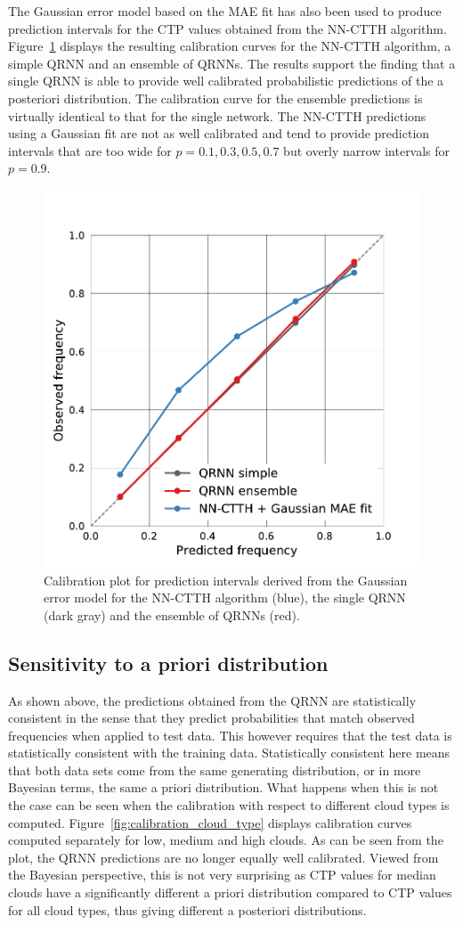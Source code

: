 \documentclass[journal abbreviation, manuscript]{copernicus}
\begin{document}
The Gaussian error model based on the MAE fit has also been used to produce
prediction intervals for the CTP values obtained from the NN-CTTH algorithm.
Figure~\ref{fig:calibration} displays the resulting calibration curves for the
NN-CTTH algorithm, a simple QRNN and an ensemble of QRNNs. The results support
the finding that a single QRNN is able to provide well calibrated probabilistic
predictions of the a posteriori distribution. The calibration curve for the
ensemble predictions is virtually identical to that for the single network. The
NN-CTTH predictions using a Gaussian fit are not as well calibrated and tend to
provide prediction intervals that are too wide for $p = 0.1, 0.3, 0.5, 0.7$ but
overly narrow intervals for $p = 0.9$.

  \begin{figure}[hbpt!]
    \centering
    \includegraphics[width = 0.5\linewidth]{../plots/fig10}
    \caption{Calibration plot for prediction intervals derived from the Gaussian
      error model for the NN-CTTH algorithm (blue), the single QRNN (dark gray) and
      the ensemble of QRNNs (red).}
    \label{fig:calibration}
  \end{figure}

\subsection{Sensitivity to a priori distribution}

As shown above, the predictions obtained from the QRNN are statistically
consistent in the sense that they predict probabilities that match observed
frequencies when applied to test data. This however requires that the test data
is statistically consistent with the training data. Statistically consistent
here means that both data sets come from the same generating distribution, or in
more Bayesian terms, the same a priori distribution. What happens when this is
not the case can be seen when the calibration with respect to different cloud
types is computed. Figure~\ref{fig:calibration_cloud_type} displays calibration
curves computed separately for low, medium and high clouds. As can be seen from the plot, the QRNN
predictions are no longer equally well calibrated. Viewed from the Bayesian
perspective, this is not very surprising as CTP values for median clouds have a
significantly different a priori distribution compared to CTP values for all
cloud types, thus giving different a posteriori distributions.
\end{document}
